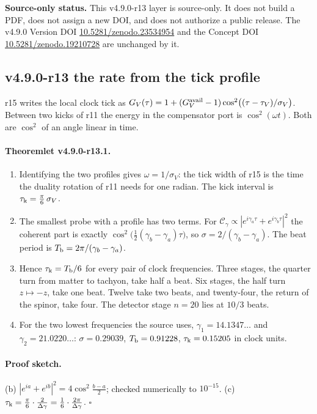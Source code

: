 \noindent\textbf{Source-only status.}
This v4.9.0-r13 layer is source-only.  It does not build a PDF, does not assign a new DOI,
and does not authorize a public release.  The v4.9.0 Version DOI
\href{https://doi.org/10.5281/zenodo.23534954}{10.5281/zenodo.23534954} and the Concept DOI
\href{https://doi.org/10.5281/zenodo.19210728}{10.5281/zenodo.19210728} are unchanged by it.

\subsection*{v4.9.0-r13 the rate from the tick profile}
\label{subsec:v490-r13-rate}

r15 writes the local clock tick as \(G_V(\tau)=1+(G_V^{\rm avail}-1)\cos^2\bigl((\tau-\tau_V)/\sigma_V\bigr)\).  Between two kicks of
r11 the energy in the compensator port is \(\cos^2(\omega t)\).  Both are \(\cos^2\) of an angle linear in time.

\paragraph{Theoremlet v4.9.0-r13.1.}
\begin{enumerate}[leftmargin=2em]
\item[(a)] Identifying the two profiles gives \(\omega=1/\sigma_V\): the tick width of r15 is the time the duality rotation of r11
needs for one radian.  The kick interval is \(\tau_{\rm k}=\tfrac\pi6\,\sigma_V\).
\item[(b)] The smallest probe with a profile has two terms.  For
\(\mathcal C_\gamma\propto|e^{i\gamma_a\tau}+e^{i\gamma_b\tau}|^2\) the coherent part is exactly
\(\cos^2\bigl(\tfrac12(\gamma_b-\gamma_a)\tau\bigr)\), so \(\sigma=2/(\gamma_b-\gamma_a)\).  The beat period is
\(T_{\rm b}=2\pi/(\gamma_b-\gamma_a)\).
\item[(c)] Hence \(\tau_{\rm k}=T_{\rm b}/6\) for every pair of clock frequencies.  Three stages, the quarter turn from matter to
tachyon, take half a beat.  Six stages, the half turn \(z\mapsto-z\), take one beat.  Twelve take two beats, and twenty-four,
the return of the spinor, take four.  The detector stage \(n=20\) lies at \(10/3\) beats.
\item[(d)] For the two lowest frequencies the source uses, \(\gamma_1=14.1347\ldots\) and \(\gamma_2=21.0220\ldots\):
\(\sigma=0.29039\), \(T_{\rm b}=0.91228\), \(\tau_{\rm k}=0.15205\) in clock units.
\end{enumerate}

\paragraph{Proof sketch.}
(b) \(|e^{ia}+e^{ib}|^2=4\cos^2\tfrac{b-a}2\); checked numerically to \(10^{-15}\).  (c) \(\tau_{\rm k}=\tfrac\pi6\cdot\tfrac2{\Delta\gamma}=
\tfrac16\cdot\tfrac{2\pi}{\Delta\gamma}\).  \(\square\)

